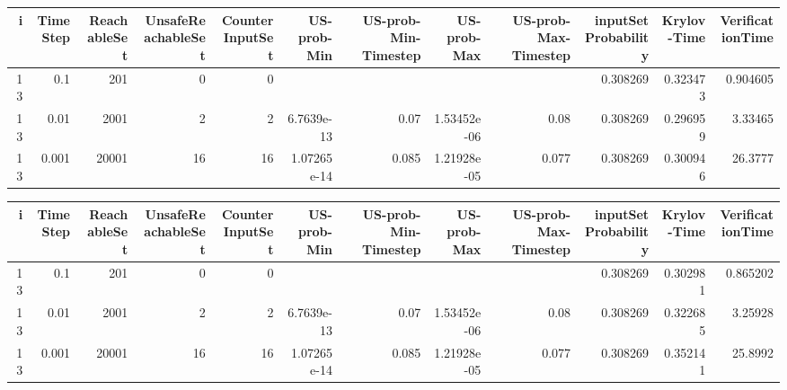 \begin{tabular}{rrrrrrrrrrrr}
\hline
   i &   TimeStep &   ReachableSet &   UnsafeReachableSet &   CounterInputSet &   US-prob-Min &   US-prob-Min-Timestep &   US-prob-Max &   US-prob-Max-Timestep &   inputSet Probability &   Krylov-Time &   VerificationTime \\
\hline
  13 &      0.1   &            201 &                    0 &                 0 &               &                        &               &                        &               0.308269 &      0.323473 &           0.904605 \\
  13 &      0.01  &           2001 &                    2 &                 2 &   6.7639e-13  &                  0.07  &   1.53452e-06 &                  0.08  &               0.308269 &      0.296959 &           3.33465  \\
  13 &      0.001 &          20001 &                   16 &                16 &   1.07265e-14 &                  0.085 &   1.21928e-05 &                  0.077 &               0.308269 &      0.300946 &          26.3777   \\
\hline
\end{tabular}
\begin{tabular}{rrrrrrrrrrrr}
\hline
   i &   TimeStep &   ReachableSet &   UnsafeReachableSet &   CounterInputSet &   US-prob-Min &   US-prob-Min-Timestep &   US-prob-Max &   US-prob-Max-Timestep &   inputSet Probability &   Krylov-Time &   VerificationTime \\
\hline
  13 &      0.1   &            201 &                    0 &                 0 &               &                        &               &                        &               0.308269 &      0.302981 &           0.865202 \\
  13 &      0.01  &           2001 &                    2 &                 2 &   6.7639e-13  &                  0.07  &   1.53452e-06 &                  0.08  &               0.308269 &      0.322685 &           3.25928  \\
  13 &      0.001 &          20001 &                   16 &                16 &   1.07265e-14 &                  0.085 &   1.21928e-05 &                  0.077 &               0.308269 &      0.352141 &          25.8992   \\
\hline
\end{tabular}


